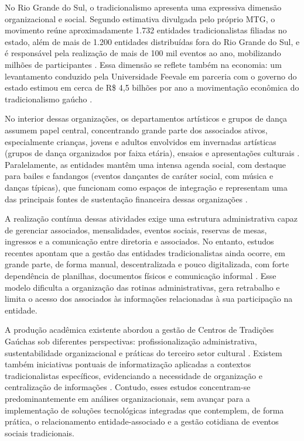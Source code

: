 \documentclass[12pt,a4paper]{article}
\begin{document}
No Rio Grande do Sul, o tradicionalismo apresenta uma expressiva dimensão organizacional e social.
Segundo estimativa divulgada pelo próprio MTG, o movimento reúne aproximadamente 1.732 entidades
tradicionalistas filiadas no estado, além de mais de 1.200 entidades distribuídas fora do Rio Grande
do Sul, e é responsável pela realização de mais de 100 mil eventos ao ano, mobilizando milhões de
participantes \parencite{mtg_site2026}. Essa dimensão se reflete também na economia: um levantamento
conduzido pela Universidade Feevale em parceria com o governo do estado estimou em cerca de R\$ 4,5
bilhões por ano a movimentação econômica do tradicionalismo gaúcho \parencite{tatsch2024}.

No interior dessas organizações, os departamentos artísticos e grupos de dança assumem papel central,
concentrando grande parte dos associados ativos, especialmente crianças, jovens e adultos envolvidos
em invernadas artísticas (grupos de dança organizados por faixa etária), ensaios e apresentações
culturais \parencite{vargas2019,fabricio2019}.
Paralelamente, as entidades mantêm uma intensa agenda social, com destaque para bailes e fandangos
(eventos dançantes de caráter social, com música e danças típicas), que funcionam como espaços de integração e representam uma das principais fontes de sustentação
financeira dessas organizações \parencite{silvaalbarello2024}.

A realização contínua dessas atividades exige uma estrutura administrativa capaz de gerenciar
associados, mensalidades, eventos sociais, reservas de mesas, ingressos e a comunicação entre
diretoria e associados. No entanto, estudos recentes apontam que a gestão das entidades
tradicionalistas ainda ocorre, em grande parte, de forma manual, descentralizada e pouco
digitalizada, com forte dependência de planilhas, documentos físicos e comunicação informal
\parencite{jardim2022,silvaalbarello2024}. Esse modelo dificulta a organização das rotinas
administrativas, gera retrabalho e limita o acesso dos associados às informações relacionadas à sua
participação na entidade.

A produção acadêmica existente abordou a gestão de Centros de Tradições Gaúchas sob diferentes
perspectivas: profissionalização administrativa, sustentabilidade organizacional e práticas do
terceiro setor cultural \parencite{vargas2019,martini2019,fabricio2019,silvaalbarello2024}. Existem
também iniciativas pontuais de informatização aplicadas a contextos tradicionalistas específicos,
evidenciando a necessidade de organização e centralização de informações \parencite{jardim2022}.
Contudo, esses estudos concentram-se predominantemente em análises organizacionais, sem avançar para
a implementação de soluções tecnológicas integradas que contemplem, de forma prática, o
relacionamento entidade-associado e a gestão cotidiana de eventos sociais tradicionais.
\end{document}
